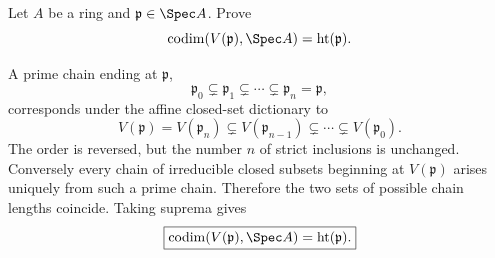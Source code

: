 \begin{problem}\label{prob:vi31-03}
Let \(A\) be a ring and \(\mathfrak p\in\Spec A\). Prove
\[
\operatorname{codim}(V(\mathfrak p),\Spec A)=\operatorname{ht}(\mathfrak p).
\]
\end{problem}

\ifdefined\FullProblemDossiers
\begin{solution}
A prime chain ending at \(\mathfrak p\),
\[
\mathfrak p_0\subsetneq\mathfrak p_1\subsetneq\cdots\subsetneq\mathfrak p_n=\mathfrak p,
\]
corresponds under the affine closed-set dictionary to
\[
V(\mathfrak p)
=
V(\mathfrak p_n)
\subsetneq
V(\mathfrak p_{n-1})
\subsetneq\cdots\subsetneq
V(\mathfrak p_0).
\]
The order is reversed, but the number \(n\) of strict inclusions is unchanged. Conversely every chain of
irreducible closed subsets beginning at \(V(\mathfrak p)\) arises uniquely from such a prime chain. Therefore the
two sets of possible chain lengths coincide. Taking suprema gives
\[
\boxed{
\operatorname{codim}(V(\mathfrak p),\Spec A)
=
\operatorname{ht}(\mathfrak p).
}
\]
\end{solution}
\fi
